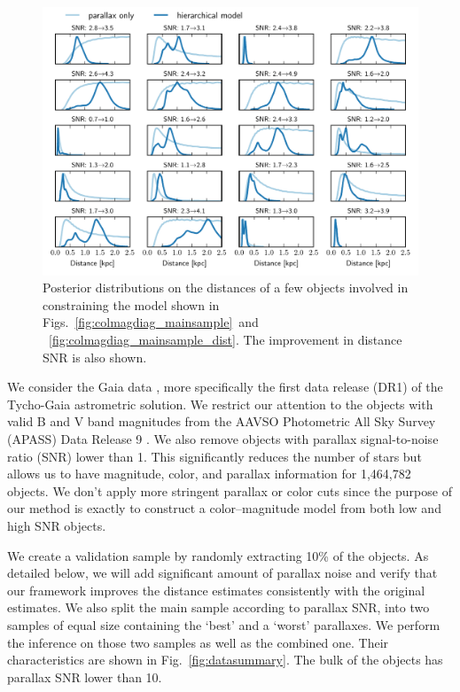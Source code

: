 \documentclass[manuscript, letterpaper]{aastex6}
\newcommand{\figref}[1]{{\xspace}Fig.~\ref{#1}}
\newcommand{\figrefs}[2]{{\xspace}Figs.~\ref{#1}~and ~\ref{#2}}
\begin{document}
\begin{figure}
\hspace*{-2mm}\includegraphics[width=15.7cm]{model_dist_pdfs.pdf}
\caption{Posterior distributions on the distances of a few objects involved in constraining the model shown in \figrefs{fig:colmagdiag_mainsample}{fig:colmagdiag_mainsample_dist}. 
The improvement in distance SNR is also shown.}
\end{figure}

We consider the Gaia data \citep{gaia}, more specifically the first data release (DR1) of the Tycho-Gaia astrometric solution\citep[hereafter TGAS][]{gaia_dr1}.
We restrict our attention to the objects with valid B and V band magnitudes from the AAVSO Photometric All Sky Survey (APASS) Data Release 9 \citep{munari2014, hendenmunari2014}. 
We also remove objects with parallax signal-to-noise ratio (SNR) lower than 1. 
This significantly reduces the number of stars but allows us to have magnitude, color, and parallax information for 1,464,782 objects. 
We don't apply more stringent parallax or color cuts since the purpose of our method is exactly to construct a color--magnitude model from both low and high SNR objects. 

We create a validation sample by randomly extracting 10\% of the objects. 
As detailed below, we will add significant amount of parallax noise and verify that our framework improves the distance estimates consistently with the original estimates. 
We also split the main sample according to parallax SNR, into two samples of equal size containing the `best' and a `worst' parallaxes. 
We perform the inference on those two samples as well as the combined one. 
Their characteristics are shown in \figref{fig:datasummary}.
The bulk of the objects has parallax SNR lower than 10. 
\end{document}
